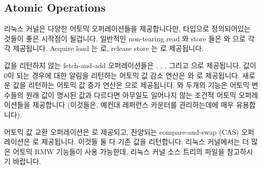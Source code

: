 \subsection{Atomic Operations}
\label{sec:toolsoftrade:Atomic Operations}

리눅스 커널은 다양한 어토믹 오퍼레이션들을 제공합니다만,  타입으로
정의되어있는 것들이 좋은 시작점이 될겁니다.
일반적인 non-tearing read 와 store 들은  와 
으로 각각 제공됩니다.
Acquire load 는  로, release store 는
 로 제공됩니다.

값을 리턴하지 않는 fetch-and-add 오퍼레이션들은 ,
, , 그리고  으로 제공됩니다.
값이 0이 되는 경우에 대한 알림을 리턴하는 어토믹 값 감소 연산은
 와  로 제공됩니다.
새로운 값을 리턴하는 어토믹 값 증가 연산은  으로
제공됩니다.
 와  두개의 기능은 어토믹
변수들의 원래 값이 명시된 값과 다르다면 아무일도 일어나지 않는 조건적 어토믹
오퍼레이션들을 제공합니다 (이것들은, 예컨대 레퍼런스 카운터를 관리하는데에 매우
유용합니다).

어토믹 값 교환 오퍼레이션은  로 제공되고, 찬양되는
compare-and-swap (CAS) 오퍼레이션은  로 제공됩니다.
이것들 둘 다 기존 값을 리턴합니다.
리눅스 커널에서는 더 많은 어토믹 RMW 기능들이 사용 가능한데, 리눅스 커널 소스
트리의  파일을 참고하시기 바랍니다.


